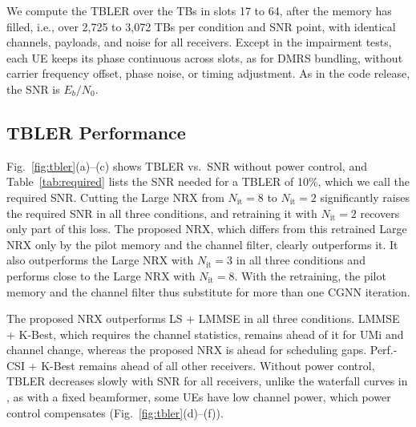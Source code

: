We compute the TBLER over the TBs in slots 17 to 64, after the memory has filled, i.e., over 2{,}725 to 3{,}072 TBs per condition and SNR point, with identical channels, payloads, and noise for all receivers. Except in the impairment tests, each UE keeps its phase continuous across slots, as for DMRS bundling, without carrier frequency offset, phase noise, or timing adjustment. As in the code release, the SNR is $E_b/N_0$.

\subsection{TBLER Performance}
Fig.~\ref{fig:tbler}(a)--(c) shows TBLER vs.\ SNR without power control, and Table~\ref{tab:required} lists the SNR needed for a TBLER of 10\%, which we call the required SNR. Cutting the Large NRX from $N_{\mathrm{it}}=8$ to $N_{\mathrm{it}}=2$ significantly raises the required SNR in all three conditions, and retraining it with $N_{\mathrm{it}}=2$ recovers only part of this loss. The proposed NRX, which differs from this retrained Large NRX only by the pilot memory and the channel filter, clearly outperforms it. It also outperforms the Large NRX with $N_{\mathrm{it}}=3$ in all three conditions and performs close to the Large NRX with $N_{\mathrm{it}}=8$. With the retraining, the pilot memory and the channel filter thus substitute for more than one CGNN iteration.

\begin{table}[t]
\centering
\caption{Required SNR [dB] for a TBLER of 10\% with 16-QAM (MCS index $i=14$).}
\label{tab:required}
\scriptsize\setlength{\tabcolsep}{3.5pt}

\end{table}

The proposed NRX outperforms LS + LMMSE in all three conditions. LMMSE + K-Best, which requires the channel statistics, remains ahead of it for UMi and channel change, whereas the proposed NRX is ahead for scheduling gaps. Perf.-CSI + K-Best remains ahead of all other receivers. Without power control, TBLER decreases slowly with SNR for all receivers, unlike the waterfall curves in \citet{wiesmayr2025realtime}, as with a fixed beamformer, some UEs have low channel power, which power control compensates (Fig.~\ref{fig:tbler}(d)--(f)).

\begin{table}[t]
\centering
\caption{TBLER [\%] of the Large NRX with $N_{\mathrm{it}}=8$ and the proposed NRX with and without memory on two further datasets, at 2, 2, 5, 4, 8, 3, 9, 17, and 3\,dB from the top.}
\label{tab:further}
\scriptsize\setlength{\tabcolsep}{3.5pt}

\end{table}

